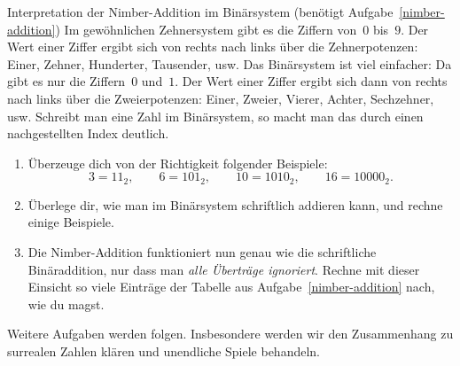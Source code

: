 \documentclass{zirkelblatt}
\begin{document}
\begin{aufgabe}{Interpretation der Nimber-Addition im Binärsystem
(benötigt Aufgabe~\ref{nimber-addition})}
\label{nimber-addition-binaer}
Im gewöhnlichen Zehnersystem gibt es die Ziffern von~$0$ bis~$9$. Der Wert
einer Ziffer ergibt sich von rechts nach links über die Zehnerpotenzen: Einer,
Zehner, Hunderter, Tausender, usw. Das Binärsystem ist viel einfacher: Da gibt
es nur die Ziffern~$0$ und~$1$. Der Wert einer Ziffer ergibt sich dann von
rechts nach links über die Zweierpotenzen: Einer, Zweier, Vierer, Achter,
Sechzehner, usw. Schreibt man eine Zahl im Binärsystem, so macht man das durch
einen nachgestellten Index deutlich.
\begin{enumerate}
\item Überzeuge dich von der Richtigkeit folgender Beispiele:
\[ 3 = 11_2, \qquad
  6 = 101_2, \qquad
  10 = 1010_2, \qquad
  16 = 10000_2. \]
\item Überlege dir, wie man im Binärsystem schriftlich addieren kann, und
rechne einige Beispiele.
\item Die Nimber-Addition funktioniert nun genau wie die schriftliche
Binäraddition, nur dass man \emph{alle Überträge ignoriert}. Rechne mit dieser
Einsicht so viele Einträge der Tabelle aus Aufgabe~\ref{nimber-addition} nach,
wie du magst.
\end{enumerate}
\end{aufgabe}

Weitere Aufgaben werden folgen. Insbesondere werden wir den Zusammenhang zu
surrealen Zahlen klären und unendliche Spiele behandeln.


\loesungenfalse
\end{document}
